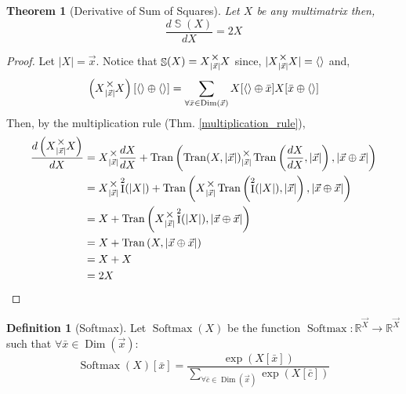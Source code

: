 \documentclass[12pt]{book}
\theoremstyle{definition}
\newtheorem{definition}{Definition}[chapter]
\theoremstyle{plain}
\newtheorem{theorem}{Theorem}[chapter]
\theoremstyle{ppart}
\theoremstyle{case}
\theoremstyle{solution}
\DeclareMathOperator{\Dim}{Dim}
\DeclareMathOperator{\Ident}{I}
\DeclareMathOperator{\Tran}{Tran}
\DeclareMathOperator{\SoS}{\mathbb{S}}
\DeclareMathOperator{\Softmax}{Softmax}
\newcommand{\mmult}[1]{\text{\raisebox{1ex}{$\underset{#1}{\times}$}}}
\begin{document}
\begin{theorem}[Derivative of Sum of Squares]
Let $X$ be any multimatrix then,
\[ \frac{d \SoS(X)}{dX} = 2X \]
\end{theorem}
\begin{proof}
Let $|X| = \vec{x}$. Notice that $\SoS(X) = X \mmult{|\vec{x}|} X$ since,
$|X \mmult{|\vec{x}|} X| = \left<\right>$ and,
\[
  \left(X \mmult{|\vec{x}|} X\right)[\left<\right> \oplus \left<\right>]
  =
  \sum_{\forall \bar{x} \in \Dim(\vec{x})}
    X[\left<\right> \oplus \bar{x}]
    X[\bar{x} \oplus \left<\right>]
\]
Then, by the multiplication rule (Thm. \ref{multiplication_rule}),
\begin{align*}
  \frac{d\left(X \mmult{|\vec{x}|} X\right)}{dX}
  &=
  X \mmult{|\vec{x}|} \frac{dX}{dX} +
  \Tran\left(
    \Tran(X, |\vec{x}|)
      \mmult{|\vec{x}|}
    \Tran\left(\frac{dX}{dX}, |\vec{x}|\right),
    |\vec{x} \oplus \vec{x}|
  \right) \\
  &=
  X \mmult{|\vec{x}|} \Ident^2(|X|) +
  \Tran\left(
    X
      \mmult{|\vec{x}|}
    \Tran\left(\Ident^2(|X|), |\vec{x}|\right),
    |\vec{x} \oplus \vec{x}|
  \right) \\
  &=
  X +
  \Tran\left(
    X
      \mmult{|\vec{x}|}
    \Ident^2(|X|),
    |\vec{x} \oplus \vec{x}|
  \right) \\
  &=
  X +
  \Tran\left(
    X,
    |\vec{x} \oplus \vec{x}|
  \right) \\
  &= X + X \\
  &= 2X
\end{align*}
\end{proof}

\begin{definition}[Softmax]
Let $\Softmax(X)$ be the function
$\Softmax : \mathbb{R}^{\vec{X}} \to \mathbb{R}^{\vec{X}}$
such that $\forall \bar{x} \in \Dim(\vec{x}):$
\[
  \Softmax(X)[\bar{x}] = \frac{
		\exp(X[\bar{x}])
	}{
		\sum_{\forall \bar{c} \in \Dim(\vec{x})} \exp(X[\bar{c}])
	}
\]
\end{definition}
\end{document}
